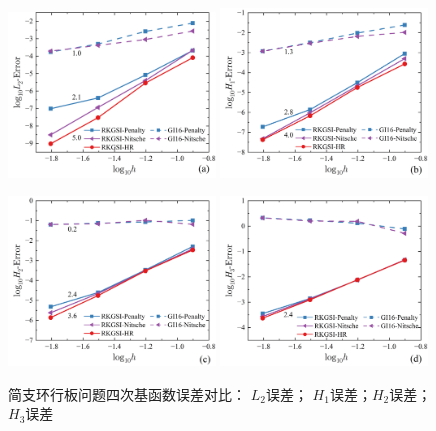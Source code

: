 \begin{figure}[H]
    \centering
    \begin{subcaptiongroup}
    \includegraphics[width=0.49\textwidth]{figure/PHR/A/QL2.png}
    \label{QL2}
    \includegraphics[width=0.49\textwidth]{figure/PHR/A/QH1.png}
    \label{QH1}
    \end{subcaptiongroup}
    \begin{subcaptiongroup}
    \includegraphics[width=0.49\textwidth]{figure/PHR/A/QH2.png}
    \label{QH2}
    \includegraphics[width=0.49\textwidth]{figure/PHR/A/QH3.png}
    \label{QH3}
    \end{subcaptiongroup}
\caption{简支环行板问题四次基函数误差对比： $L_2$误差； $H_1$误差；$H_2$误差； $H_3$误差}
\label{AQLH}
\end{figure}
